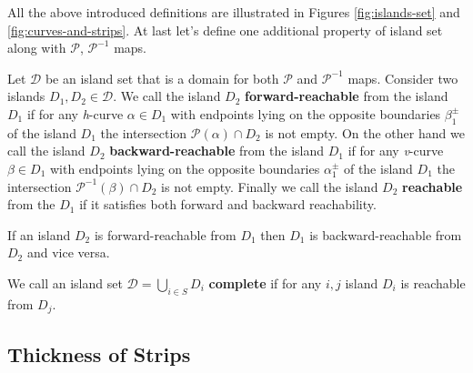 All the above introduced definitions are illustrated in Figures \ref{fig:islands-set} and \ref{fig:curves-and-strips}.
At last let's define one additional property of island set along with $\mathcal{P}$, $\mathcal{P}^{-1}$ maps.

\begin{definition}
	Let $\mathcal{D}$ be an island set that is a domain for both $\mathcal{P}$ and $\mathcal{P}^{-1}$ maps.
	Consider two islands $D_1, D_2 \in \mathcal{D}$.
	We call the island $D_2$ {\bf forward-reachable} from the island $D_1$ if for any \emph{h}-curve $\alpha \in D_1$ with endpoints lying on the opposite boundaries $\beta_1^{\pm}$ of the island $D_1$ the intersection $\mathcal{P}(\alpha) \cap D_2$ is not empty.
	On the other hand we call the island $D_2$ {\bf backward-reachable} from the island $D_1$ if for any \emph{v}-curve $\beta \in D_1$ with endpoints lying on the opposite boundaries $\alpha_1^{\pm}$ of the island $D_1$ the intersection $\mathcal{P}^{-1}(\beta) \cap D_2$ is not empty.
	Finally we call the island $D_2$ {\bf reachable} from the $D_1$ if it satisfies both forward and backward reachability.
\end{definition}

\begin{remark}
	If an island $D_2$ is forward-reachable from $D_1$ then $D_1$ is backward-reachable from $D_2$ and vice versa.
\end{remark}

\begin{definition}
	We call an island set $\mathcal{D} = \bigcup_{i \in S} D_i$ {\bf complete} if for any $i, j$ island $D_i$ is reachable from $D_j$.
\label{def:complete-island-set}
\end{definition}

\subsection{Thickness of Strips}

